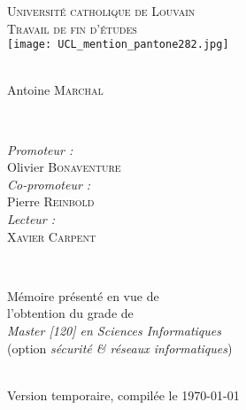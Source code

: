 \documentclass[a4paper, twoside, 12pt, french]{report}
\begin{document}
\begin{titlepage}
\center

\textsc{\LARGE Université catholique de Louvain}\\[1cm]
\textsc{\Large Travail de fin d'études}\\[2cm]

\texttt{[image: UCL\_mention\_pantone282.jpg]}\\[1.5cm]

\textsc{\Large }\\[1.5cm]

\begin{minipage}{0.4\textwidth}
\begin{center}
\large Antoine \textsc{Marchal}
\end{center}
\end{minipage}\\[3cm]

\begin{minipage}{0.4\textwidth}
\begin{flushleft} \large
\emph{Promoteur :} \\
Olivier \textsc{Bonaventure}\\
\emph{Co-promoteur :} \\
Pierre \textsc{Reinbold}\\
\emph{Lecteur :} \\
\textsc{Xavier Carpent}
\end{flushleft}
\end{minipage}
~
\begin{minipage}{0.5\textwidth}
\begin{flushright} \large
{\normalsize Mémoire présenté en vue de\\
l'obtention du grade de\\
\emph{Master [120] en Sciences Informatiques}\\
(option \emph{sécurité \& réseaux informatiques})}
\end{flushright}
\end{minipage}\\[1.5cm]


{\huge Version temporaire, compilée le \today}

\end{titlepage}

\pagestyle{empty} %
\tableofcontents
\restoregeometry
\clearpage %
\pagestyle{fancy}












%



\end{document}
